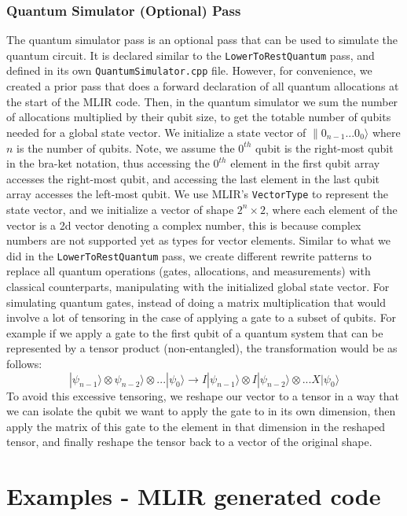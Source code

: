 \subsubsection{Quantum Simulator (Optional) Pass}
The quantum simulator pass is an optional pass that can be used to simulate the
quantum circuit. It is declared similar to the \texttt{LowerToRestQuantum} pass, and
defined in its own \texttt{QuantumSimulator.cpp} file. 
However, for convenience, we created a prior pass that does a forward
declaration of all quantum allocations at the start of the MLIR code.
Then, in the quantum simulator we sum the number of allocations multiplied by their qubit size,
to get the totable number of qubits needed for a global state vector.
We initialize a state vector of $\|0_{n-1}...0_0\rangle$ where $n$ is the number of qubits.
Note, we assume the $0^{th}$ qubit is the right-most qubit in the bra-ket notation, thus
accessing the $0^{th}$ element in the first qubit array accesses the right-most qubit, and accessing 
the last element in the last qubit array accesses the left-most qubit.
We use MLIR's \texttt{VectorType} to represent the state vector,
and we initialize a vector of shape $2^n \times 2$, where each element
of the vector is a 2d vector denoting a complex number, this is because
complex numbers are not supported yet as types for vector elements.
Similar to what we did in the \texttt{LowerToRestQuantum} pass, we create different
rewrite patterns to replace all quantum operations (gates, allocations, and measurements)
with classical counterparts, manipulating with the initialized global
state vector. For simulating quantum gates, instead of 
 doing a matrix multiplication that would
involve a lot of tensoring in the case of applying a gate to a subset of qubits.
For example if we apply a gate to the first qubit of a quantum system that can be represented by a 
tensor product (non-entangled), the transformation would be as follows:
\begin{equation}
|\psi_{n-1}\rangle \otimes \psi_{n-2}\rangle  \otimes ... |\psi_0\rangle
 \rightarrow
 I  |\psi_{n-1}\rangle \otimes I  |\psi_{n-2}\rangle  \otimes ... X  |\psi_0\rangle 
\end{equation}
To avoid this excessive tensoring, we reshape our vector to a tensor in a way that we can
isolate the qubit we want to apply the gate to in its own dimension, then apply the matrix of this gate
to the element in that dimension in the reshaped tensor, 
and finally reshape the tensor back to a vector of the original shape.


\section{Examples - MLIR generated code}